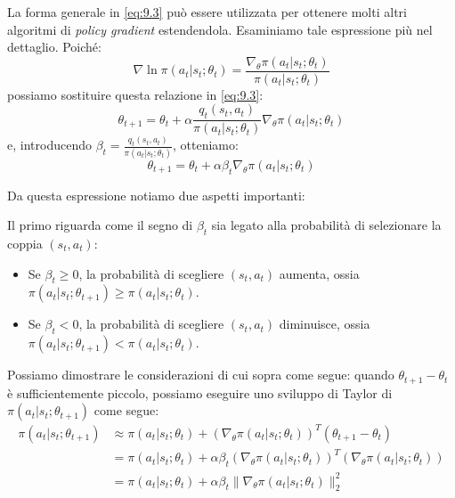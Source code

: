 ﻿\documentclass[11pt, a4paper]{report}
\begin{document}
La forma generale in \eqref{eq:9.3} può essere utilizzata per ottenere molti altri algoritmi di \emph{policy gradient} estendendola. Esaminiamo tale espressione più nel dettaglio. Poiché:
\begin{equation}
\nabla \ln \pi(a_t | s_t; \theta_t) = \frac{\nabla_\theta \pi(a_t | s_t; \theta_t)}{\pi(a_t | s_t; \theta_t)} \label{eq:9.4}
\end{equation}
possiamo sostituire questa relazione in \eqref{eq:9.3}:
\begin{equation}
\theta_{t+1} = \theta_t + \alpha \frac{q_t(s_t, a_t)}{\pi(a_t | s_t; \theta_t)} \nabla_\theta \pi(a_t | s_t; \theta_t) \label{eq:9.5}
\end{equation}
e, introducendo $\beta_t = \frac{q_t(s_t, a_t)}{\pi(a_t | s_t; \theta_t)}$, otteniamo:
\begin{equation}
\theta_{t+1} = \theta_t + \alpha\beta_t \nabla_\theta \pi(a_t | s_t; \theta_t) \label{eq:9.6}
\end{equation}

Da questa espressione notiamo due aspetti importanti:

Il primo riguarda come il segno di $\beta_t$ sia legato alla probabilità di selezionare la coppia $(s_t, a_t)$:
\begin{itemize}[noitemsep]
    \item Se $\beta_t \ge 0$, la probabilità di scegliere $(s_t, a_t)$ aumenta, ossia $\pi(a_t | s_t; \theta_{t+1}) \ge \pi(a_t | s_t; \theta_t)$.
    \item Se $\beta_t < 0$, la probabilità di scegliere $(s_t, a_t)$ diminuisce, ossia $\pi(a_t | s_t; \theta_{t+1}) < \pi(a_t | s_t; \theta_t)$.
\end{itemize}

Possiamo dimostrare le considerazioni di cui sopra come segue: quando $\theta_{t+1} - \theta_t$ è sufficientemente piccolo, possiamo eseguire uno sviluppo di Taylor di $\pi(a_t | s_t; \theta_{t+1})$ come segue:
\begin{align}
\pi(a_t | s_t; \theta_{t+1}) &\approx \pi(a_t | s_t; \theta_t) + \left(\nabla_\theta \pi(a_t | s_t; \theta_t)\right)^T (\theta_{t+1} - \theta_t) \label{eq:9.7} \\
&= \pi(a_t | s_t; \theta_t) + \alpha\beta_t \left(\nabla_\theta \pi(a_t | s_t; \theta_t)\right)^T \left(\nabla_\theta \pi(a_t | s_t; \theta_t)\right) \label{eq:9.8} \\
&= \pi(a_t | s_t; \theta_t) + \alpha\beta_t \|\nabla_\theta \pi(a_t | s_t; \theta_t)\|_2^2 \label{eq:9.9}
\end{align}
\end{document}
